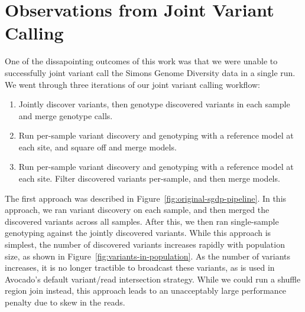 \documentclass[phd]{ucbthesis}
\begin{document}
\section{Observations from Joint Variant Calling}
\label{sec:joint-calling}

One of the dissapointing outcomes of this work was that we were unable to
successfully joint variant call the Simons Genome Diversity data in a single run.
We went through three iterations of our joint variant calling workflow:

\begin{enumerate}
\item Jointly discover variants, then genotype discovered variants in each
  sample and merge genotype calls.
\item Run per-sample variant discovery and genotyping with a reference model at
  each site, and square off and merge models.
\item Run per-sample variant discovery and genotyping with a reference model at
  each site. Filter discovered variants per-sample, and then merge models.
\end{enumerate}

The first approach was described in Figure~\ref{fig:original-sgdp-pipeline}. In
this approach, we ran variant discovery on each sample, and then merged the
discovered variants across all samples. After this, we then ran single-sample
genotyping against the jointly discovered variants. While this approach is
simplest, the number of discovered variants increases rapidly with population
size, as shown in Figure~\ref{fig:variants-in-population}. As the number of
variants increases, it is no longer tractible to broadcast these variants, as
is used in Avocado's default variant/read intersection strategy. While we could
run a shuffle region join instead, this approach leads to an unacceptably large
performance penalty due to skew in the reads.
\end{document}
